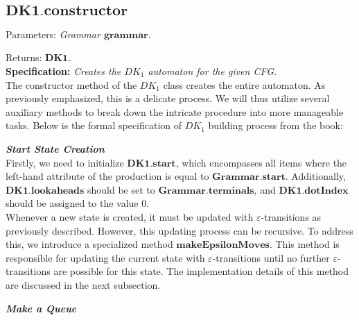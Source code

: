 \vspace{10pt}

\subsection{\(\boldsymbol{DK1.constructor}\)}

Parameters: \textit{Grammar \(\boldsymbol{grammar}\).}

Returns: \textit{\(\boldsymbol{DK1}\).}\\

\textbf{Specification:} \textit{Creates the \(DK_{1}\) automaton for the given CFG.}\\

The constructor method of the \(DK_{1}\) class creates the entire automaton. As previously emphasized, this is a delicate process. We will thus utilize several auxiliary methods to break down the intricate procedure into more manageable tasks. Below is the formal specification of \(DK_{1}\) building process from the book:\\


\vspace{15pt}

\textbf{\textit{Start State Creation}}\\

Firstly, we need to initialize \(\boldsymbol{DK1.start}\), which encompasses all items where the left-hand attribute of the production is equal to \(\boldsymbol{Grammar.start}\). Additionally, \(\boldsymbol{DK1.lookaheads}\) should be set to \(\boldsymbol{Grammar.terminals}\), and \(\boldsymbol{DK1.dotIndex}\) should be assigned to the value 0.\\

Whenever a new state is created, it must be updated with \(\varepsilon\)-transitions as previously described. However, this updating process can be recursive. To address this, we introduce a specialized method \(\boldsymbol{makeEpsilonMoves}\). This method is responsible for updating the current state with \(\varepsilon\)-transitions until no further \(\varepsilon\)-transitions are possible for this state. The implementation details of this method are discussed in the next subsection.\\

\vspace{15pt}

\textbf{\textit{Make a Queue}}\\

